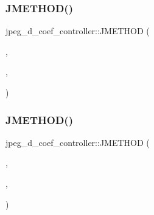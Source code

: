 \mbox{\label{structjpeg__d__coef__controller_addb7a363607be97630bf37175267fd58}} 
\subsubsection{\texorpdfstring{JMETHOD()}{JMETHOD()}\hspace{0.1cm}{\footnotesize\ttfamily [3/4]}}
{\footnotesize\ttfamily jpeg\+\_\+d\+\_\+coef\+\_\+controller\+::\+J\+M\+E\+T\+H\+OD (\begin{DoxyParamCaption}\item[{void}]{,  }\item[{\mbox{\hyperlink{jdcoefct_8c_adf23b9a09770b5e038955fa770f95060}{start\+\_\+output\+\_\+pass}}}]{,  }\item[{(\mbox{\hyperlink{jpeglib_8h_a00c7d78af44bd26a901c791ccfc1e178}{j\+\_\+decompress\+\_\+ptr}} cinfo)}]{ }\end{DoxyParamCaption})}

\mbox{\label{structjpeg__d__coef__controller_a5d61ba56d9f5d8de0662df091aa6d9e1}} 
\subsubsection{\texorpdfstring{JMETHOD()}{JMETHOD()}\hspace{0.1cm}{\footnotesize\ttfamily [4/4]}}
{\footnotesize\ttfamily jpeg\+\_\+d\+\_\+coef\+\_\+controller\+::\+J\+M\+E\+T\+H\+OD (\begin{DoxyParamCaption}\item[{int}]{,  }\item[{\mbox{\hyperlink{jdcoefct_8c_aeb3959a425ae15d61d141f82da1087aa}{decompress\+\_\+data}}}]{,  }\item[{(\mbox{\hyperlink{jpeglib_8h_a00c7d78af44bd26a901c791ccfc1e178}{j\+\_\+decompress\+\_\+ptr}} cinfo, \mbox{\hyperlink{jpeglib_8h_a4bf858e4d42202287e786bdec2f3b62b}{J\+S\+A\+M\+P\+I\+M\+A\+GE}} \mbox{\hyperlink{jdct_8h_ad7e4660a191b1a791748dd44d5a7a0ec}{output\+\_\+buf}})}]{ }\end{DoxyParamCaption})}




